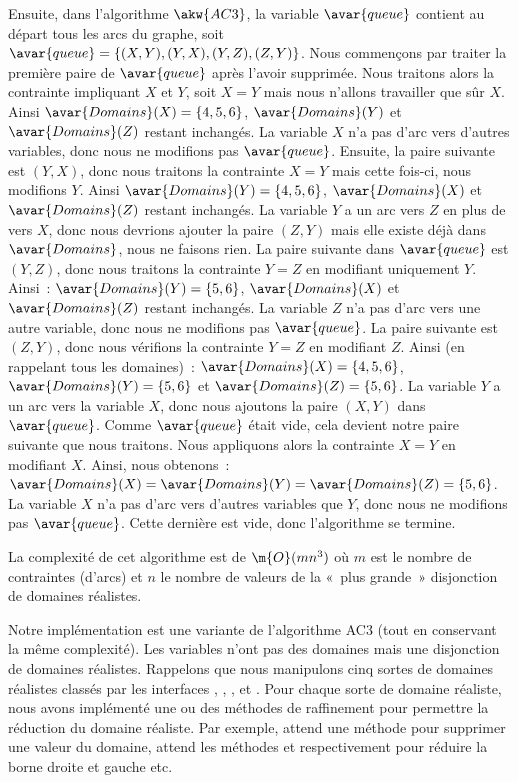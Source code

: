 \begin{example}
\begin{itemize}
\end{itemize}
%
Ensuite, dans l'algorithme $\akw{AC3}$, la variable $\avar{queue}$ contient au
départ tous les arcs du graphe, soit $\avar{queue} = \{(X, Y), (Y, X), (Y, Z),
(Z, Y)\}$. Nous commençons par traiter la première paire de $\avar{queue}$ après
l'avoir supprimée. Nous traitons alors la contrainte impliquant $X$ et $Y$, soit
$X = Y$ mais nous n'allons travailler que sûr $X$.  Ainsi $\avar{Domains}(X) =
\{4, 5, 6\}$, $\avar{Domains}(Y)$ et $\avar{Domains}(Z)$ restant inchangés. La
variable $X$ n'a pas d'arc vers d'autres variables, donc nous ne modifions pas
$\avar{queue}$.  Ensuite, la paire suivante est $(Y, X)$, donc nous traitons la
contrainte $X = Y$ mais cette fois-ci, nous modifions $Y$. Ainsi
$\avar{Domains}(Y) = \{4, 5, 6\}$, $\avar{Domains}(X)$ et $\avar{Domains}(Z)$
restant inchangés.  La variable $Y$ a un arc vers $Z$ en plus de vers $X$, donc
nous devrions ajouter la paire $(Z, Y)$ mais elle existe déjà dans
$\avar{Domains}$, nous ne faisons rien.  La paire suivante dans $\avar{queue}$
est $(Y, Z)$, donc nous traitons la contrainte $Y = Z$ en modifiant uniquement
$Y$. Ainsi~: $\avar{Domains}(Y) = \{5, 6\}$, $\avar{Domains}(X)$ et
$\avar{Domains}(Z)$ restant inchangés. La variable $Z$ n'a pas d'arc vers une
autre variable, donc nous ne modifions pas $\avar{queue}$. La paire suivante est
$(Z, Y)$, donc nous vérifions la contrainte $Y = Z$ en modifiant $Z$. Ainsi (en
rappelant tous les domaines)~: $\avar{Domains}(X) = \{4, 5, 6\}$,
$\avar{Domains}(Y) = \{5, 6\}$ et $\avar{Domains}(Z) = \{5, 6\}$. La variable
$Y$ a un arc vers la variable $X$, donc nous ajoutons la paire $(X, Y)$ dans
$\avar{queue}$.  Comme $\avar{queue}$ était vide, cela devient notre paire
suivante que nous traitons. Nous appliquons alors la contrainte $X = Y$ en
modifiant $X$.  Ainsi, nous obtenons~: $\avar{Domains}(X) = \avar{Domains}(Y) =
\avar{Domains}(Z) = \{5, 6\}$. La variable $X$ n'a pas d'arc vers d'autres
variables que $Y$, donc nous ne modifions pas $\avar{queue}$. Cette dernière est
vide, donc l'algorithme se termine.

\end{example}

La complexité de cet algorithme est de $\m{O}(mn^3)$ où $m$ est le nombre de
contraintes (d'arcs) et $n$ le nombre de valeurs de la «~plus grande~»
disjonction de domaines réalistes.

Notre implémentation est une variante de l'algorithme AC3 (tout en conservant la
même complexité). Les variables n'ont pas des domaines mais une disjonction de
domaines réalistes. Rappelons que nous manipulons cinq sortes de domaines
réalistes classés par les interfaces , ,
,  et . Pour chaque sorte de
domaine réaliste, nous avons implémenté une ou des méthodes de raffinement pour
permettre la réduction du domaine réaliste. Par exemple,  attend
une méthode  pour supprimer une valeur du domaine,
 attend les méthodes  et 
respectivement pour réduire la borne droite et gauche etc.

